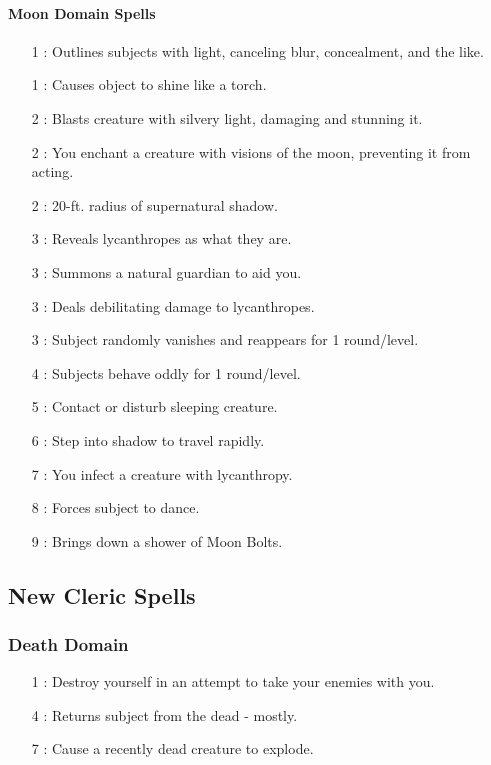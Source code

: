 \paragraph{Moon Domain Spells}
\begin{itemize}
 \item[1] : Outlines subjects with light, canceling blur, concealment, and the like.
 \item[1] : Causes object to shine like a torch.
 \item[2] : Blasts creature with silvery light, damaging and stunning it.
 \item[2] : You enchant a creature with visions of the moon, preventing it from acting.
 \item[2] : 20-ft. radius of supernatural shadow.
 \item[3] : Reveals lycanthropes as what they are.
 \item[3] : Summons a natural guardian to aid you.
 \item[3] : Deals debilitating damage to lycanthropes.
 \item[3] : Subject randomly vanishes and reappears for 1 round/level.
 \item[4] : Subjects behave oddly for 1 round/level.
 \item[5] : Contact or disturb sleeping creature.
 \item[6] : Step into shadow to travel rapidly.
 \item[7] : You infect a creature with lycanthropy.
 \item[8] : Forces subject to dance.
 \item[9] : Brings down a shower of Moon Bolts.
\end{itemize}

\subsection{New Cleric Spells}
\subsubsection{Death Domain}
\begin{itemize}
 \item[1] : Destroy yourself in an attempt to take your enemies with you.
 \item[4] : Returns subject from the dead - mostly.
 \item[7] : Cause a recently dead creature to explode.
\end{itemize}
